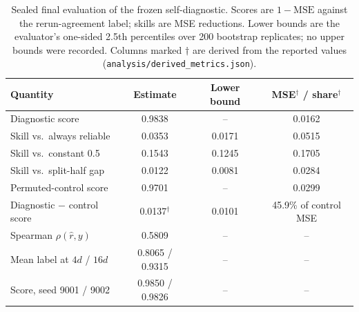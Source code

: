 \documentclass{article}
\newcommand{\rhat}{\hat r}
\begin{document}
\begin{table}[t]
\centering
\caption{Sealed final evaluation of the frozen self-diagnostic. Scores are $1-\text{MSE}$ against the rerun-agreement label; skills are MSE reductions. Lower bounds are the evaluator's one-sided 2.5th percentiles over 200 bootstrap replicates; no upper bounds were recorded. Columns marked $\dagger$ are derived from the reported values (\texttt{analysis/derived\_metrics.json}).}
\label{tab:main}
\small
\begin{tabular}{lccc}
\toprule
Quantity & Estimate & Lower bound & MSE$^\dagger$ / share$^\dagger$ \\
\midrule
Diagnostic score & 0.9838 & -- & 0.0162 \\
Skill vs.\ always reliable & 0.0353 & 0.0171 & 0.0515 \\
Skill vs.\ constant 0.5 & 0.1543 & 0.1245 & 0.1705 \\
Skill vs.\ split-half gap & 0.0122 & 0.0081 & 0.0284 \\
Permuted-control score & 0.9701 & -- & 0.0299 \\
Diagnostic $-$ control score & 0.0137$^\dagger$ & 0.0101 & 45.9\% of control MSE \\
Spearman $\rho(\rhat,y)$ & 0.5809 & -- & -- \\
Mean label at $4d$ / $16d$ & 0.8065 / 0.9315 & -- & -- \\
Score, seed 9001 / 9002 & 0.9850 / 0.9826 & -- & -- \\
\bottomrule
\end{tabular}
\end{table}
\end{document}
